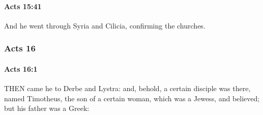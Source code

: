 		\paragraph{Acts 15:41} %
			\label{ACTS-15-41}

			And he went through Syria and Cilicia, confirming the churches.

			\begin{framed}
			\scriptsize
				\begin{compactdesc}
					\item[SBLG] 
				\end{compactdesc}
			\end{framed}

	\subsubsection{Acts 16} %
		\label{ACTS-16}
		
		\paragraph{Acts 16:1} %
			\label{ACTS-16-1}

			THEN came he to Derbe and Lystra: and, behold, a certain disciple was there, named Timotheus, the son of a certain woman, which was a Jewess, and believed; but his father was a Greek:

